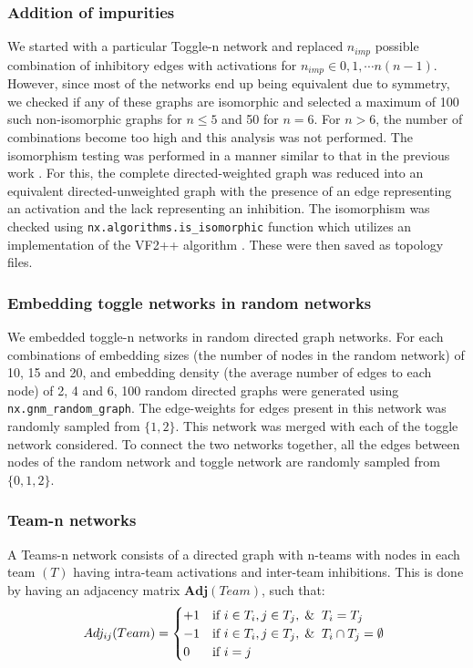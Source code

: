 \documentclass[11pt,a4paper]{article}
\theoremstyle{definition}
\theoremstyle{remark}
\begin{document}
\subsubsection{Addition of impurities}
We started with a particular Toggle-n network and replaced $n_{imp}$ possible combination of inhibitory edges with activations for $n_{imp} \in {0,1,\cdots n(n-1)}$. However, since most of the networks end up being equivalent due to symmetry, we checked if any of these graphs are isomorphic and selected a maximum of 100 such non-isomorphic graphs for $n \leq 5$ and 50 for $n = 6$. For $n > 6$, the number of combinations become too high and this analysis was not performed. The isomorphism testing was performed in a manner similar to that in the previous work \parencite{duddu_multistability_2024}. For this, the complete directed-weighted graph was reduced into an equivalent directed-unweighted graph with the presence of an edge representing an activation and the lack representing an inhibition. The isomorphism was checked using \texttt{nx.algorithms.is\_isomorphic} function which utilizes an implementation of the VF2++ algorithm \parencite{foggia_improved_2001}. These were then saved as topology files.

\subsubsection{Embedding toggle networks in random networks}
We embedded toggle-n networks in random directed graph networks. For each combinations of embedding sizes (the number of nodes in the random network) of 10, 15 and 20, and embedding density (the average number of edges to each node) of 2, 4 and 6, 100 random directed graphs were generated using \texttt{nx.gnm\_random\_graph}. The edge-weights for edges present in this network was randomly sampled from $\{1,2\}$. This network was merged with each of the toggle network considered. To connect the two networks together, all the edges between nodes of the random network and toggle network are randomly sampled from $\{0,1,2\}$.

\subsubsection{Team-n networks}
A Teams-n network consists of a directed graph with n-teams with nodes in each team $(T)$ having intra-team activations and inter-team inhibitions. This is done by having an adjacency matrix $\mathbf{Adj}(Team)$, such that:
\begin{equation}
    Adj_{ij}(Team) = \begin{cases}
      +1 & \text{if $i \in T_i, j \in T_j,\And T_i  = T_j$}\\
      -1 & \text{if $i \in T_i, j \in T_j,\And T_i \cap T_j = \emptyset$ }\\
      0 & \text{if $i = j$}
    \end{cases}
    \label{team-adjmat-eq}
\end{equation}
\end{document}
